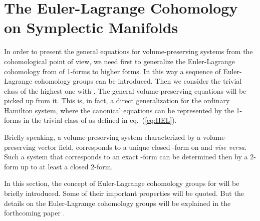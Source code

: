 \documentclass[12pt,a4paper]{article}
\begin{document}
\section{The Euler-Lagrange Cohomology on Symplectic Manifolds}

In order to  present the general equations for volume-preserving
systems from the cohomological point of view, we need first to
generalize the Euler-Lagrange cohomology from \coordHE{} of
1-forms to higher forms. In this way a sequence of Euler-Lagrange
cohomology groups \coordHE{} can
be introduced. Then we consider the trivial class of the highest
one with \coordHE{}. The general volume-preserving equations will be
picked up from it. This is, in fact, a direct generalization for
the ordinary Hamilton system, where the canonical equations can be
represented by the 1-forms in the trivial class of
\coordHE{} as defined in eq.~(\ref{eq:HEL}).



Briefly speaking, a volume-preserving system characterized by a
volume-preserving vector field, corresponds to a unique closed
\coordHE{}-form on \coordHE{} and \textit{vise versa}. Such
a system that corresponds to an exact \coordHE{}-form can be
determined then by a 2-form up to at least a closed
2-form.



In this section, the concept of Euler-Lagrange cohomology groups
\coordHE{} for \coordHE{} will be briefly introduced. Some of their important properties
will be quoted. But the details on the Euler-Lagrange cohomology
groups will be explained in the forthcoming paper \cite{gpwz2}.
\end{document}
